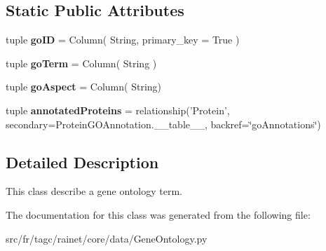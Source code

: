 \subsection*{Static Public Attributes}
\begin{DoxyCompactItemize}
\item 
\hypertarget{classsrc_1_1fr_1_1tagc_1_1rainet_1_1core_1_1data_1_1GeneOntology_1_1GeneOntology_a55e56b33490195397547c192cea5f7ed}{tuple {\bfseries go\-I\-D} = Column( String, primary\-\_\-key = True )}\label{classsrc_1_1fr_1_1tagc_1_1rainet_1_1core_1_1data_1_1GeneOntology_1_1GeneOntology_a55e56b33490195397547c192cea5f7ed}

\item 
\hypertarget{classsrc_1_1fr_1_1tagc_1_1rainet_1_1core_1_1data_1_1GeneOntology_1_1GeneOntology_a48f0ec4d3d50a09f615ea80db3924582}{tuple {\bfseries go\-Term} = Column( String )}\label{classsrc_1_1fr_1_1tagc_1_1rainet_1_1core_1_1data_1_1GeneOntology_1_1GeneOntology_a48f0ec4d3d50a09f615ea80db3924582}

\item 
\hypertarget{classsrc_1_1fr_1_1tagc_1_1rainet_1_1core_1_1data_1_1GeneOntology_1_1GeneOntology_a4476e0800ca3ab0b2a74355041ab79ca}{tuple {\bfseries go\-Aspect} = Column( String)}\label{classsrc_1_1fr_1_1tagc_1_1rainet_1_1core_1_1data_1_1GeneOntology_1_1GeneOntology_a4476e0800ca3ab0b2a74355041ab79ca}

\item 
\hypertarget{classsrc_1_1fr_1_1tagc_1_1rainet_1_1core_1_1data_1_1GeneOntology_1_1GeneOntology_a97b454c923caabc177005978897bafb6}{tuple {\bfseries annotated\-Proteins} = relationship('Protein', secondary=Protein\-G\-O\-Annotation.\-\_\-\-\_\-table\-\_\-\-\_\-, backref=\char`\"{}go\-Annotations\char`\"{})}\label{classsrc_1_1fr_1_1tagc_1_1rainet_1_1core_1_1data_1_1GeneOntology_1_1GeneOntology_a97b454c923caabc177005978897bafb6}

\end{DoxyCompactItemize}


\subsection{Detailed Description}
This class describe a gene ontology term. 

The documentation for this class was generated from the following file\-:\begin{DoxyCompactItemize}
\item 
src/fr/tagc/rainet/core/data/Gene\-Ontology.\-py\end{DoxyCompactItemize}
